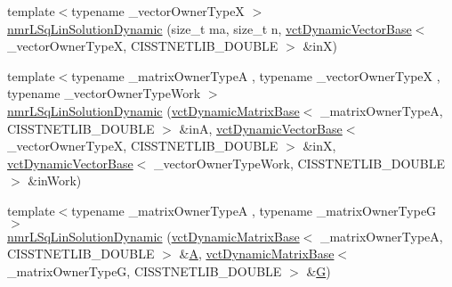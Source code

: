 \begin{DoxyCompactItemize}
\item 
{\footnotesize template$<$typename \-\_\-vector\-Owner\-Type\-X $>$ }\\\hyperlink{classnmr_l_sq_lin_solution_dynamic_a6e94a5c674ff90aa5ad28d0db4b47e72}{nmr\-L\-Sq\-Lin\-Solution\-Dynamic} (size\-\_\-t ma, size\-\_\-t n, \hyperlink{classvct_dynamic_vector_base}{vct\-Dynamic\-Vector\-Base}$<$ \-\_\-vector\-Owner\-Type\-X, C\-I\-S\-S\-T\-N\-E\-T\-L\-I\-B\-\_\-\-D\-O\-U\-B\-L\-E $>$ \&in\-X)
\item 
{\footnotesize template$<$typename \-\_\-matrix\-Owner\-Type\-A , typename \-\_\-vector\-Owner\-Type\-X , typename \-\_\-vector\-Owner\-Type\-Work $>$ }\\\hyperlink{classnmr_l_sq_lin_solution_dynamic_a02fd55ba7e56df9c56364ff10720f88e}{nmr\-L\-Sq\-Lin\-Solution\-Dynamic} (\hyperlink{classvct_dynamic_matrix_base}{vct\-Dynamic\-Matrix\-Base}$<$ \-\_\-matrix\-Owner\-Type\-A, C\-I\-S\-S\-T\-N\-E\-T\-L\-I\-B\-\_\-\-D\-O\-U\-B\-L\-E $>$ \&in\-A, \hyperlink{classvct_dynamic_vector_base}{vct\-Dynamic\-Vector\-Base}$<$ \-\_\-vector\-Owner\-Type\-X, C\-I\-S\-S\-T\-N\-E\-T\-L\-I\-B\-\_\-\-D\-O\-U\-B\-L\-E $>$ \&in\-X, \hyperlink{classvct_dynamic_vector_base}{vct\-Dynamic\-Vector\-Base}$<$ \-\_\-vector\-Owner\-Type\-Work, C\-I\-S\-S\-T\-N\-E\-T\-L\-I\-B\-\_\-\-D\-O\-U\-B\-L\-E $>$ \&in\-Work)
\item 
{\footnotesize template$<$typename \-\_\-matrix\-Owner\-Type\-A , typename \-\_\-matrix\-Owner\-Type\-G $>$ }\\\hyperlink{classnmr_l_sq_lin_solution_dynamic_a846e92e9d8d04ce4b9ff280c9903f548}{nmr\-L\-Sq\-Lin\-Solution\-Dynamic} (\hyperlink{classvct_dynamic_matrix_base}{vct\-Dynamic\-Matrix\-Base}$<$ \-\_\-matrix\-Owner\-Type\-A, C\-I\-S\-S\-T\-N\-E\-T\-L\-I\-B\-\_\-\-D\-O\-U\-B\-L\-E $>$ \&\hyperlink{classnmr_l_sq_lin_solution_dynamic_aa4a41abac141e2e55dd5cafb59169dfd}{A}, \hyperlink{classvct_dynamic_matrix_base}{vct\-Dynamic\-Matrix\-Base}$<$ \-\_\-matrix\-Owner\-Type\-G, C\-I\-S\-S\-T\-N\-E\-T\-L\-I\-B\-\_\-\-D\-O\-U\-B\-L\-E $>$ \&\hyperlink{classnmr_l_sq_lin_solution_dynamic_a399cb314fb848d36f58c14830bad0c28}{G})
\item 

\end{DoxyCompactItemize}

